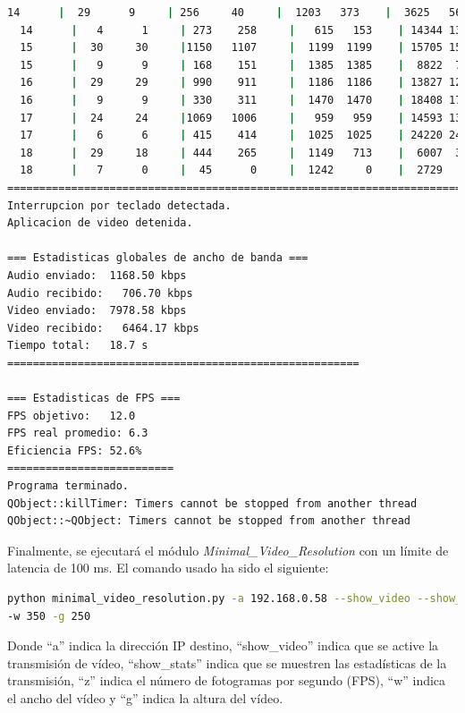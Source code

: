 \begin{lstlisting}[language=bash,basicstyle=\ttfamily\scriptsize]
  14      |  29      9     | 256     40     |  1203   373    |  3625   567    |  35     65
  14      |   4      1     | 273    258     |   615   153    | 14344 13555    |  18     64
  15      |  30     30     |1150   1107     |  1199  1199    | 15705 15117    |  25     69
  15      |   9      9     | 168    151     |  1385  1385    |  8822  7937    |  23     71
  16      |  29     29     | 990    911     |  1186  1186    | 13827 12725    |  36     72
  16      |   9      9     | 330    311     |  1470  1470    | 18408 17347    |  24     71
  17      |  24     24     |1069   1006     |   959   959    | 14593 13732    |  28     69
  17      |   6      6     | 415    414     |  1025  1025    | 24220 24162    |  31     72
  18      |  29     18     | 444    265     |  1149   713    |  6007  3584    |  31     72
  18      |   7      0     |  45      0     |  1242     0    |  2729     0    |  32     71
============================================================================================
Interrupcion por teclado detectada.
Aplicacion de video detenida.

=== Estadisticas globales de ancho de banda ===
Audio enviado:	1168.50 kbps
Audio recibido:   706.70 kbps
Video enviado:	7978.58 kbps
Video recibido:   6464.17 kbps
Tiempo total: 	18.7 s
=======================================================

=== Estadisticas de FPS ===
FPS objetivo: 	12.0
FPS real promedio: 6.3
Eficiencia FPS:	52.6%
==========================
Programa terminado.
QObject::killTimer: Timers cannot be stopped from another thread
QObject::~QObject: Timers cannot be stopped from another thread
\end{lstlisting}
\vspace{\baselineskip}

\newpage

Finalmente, se ejecutará el módulo \textit{Minimal\_Video\_Resolution} con un límite de latencia de 100 ms. El comando usado ha sido el siguiente:

\begin{lstlisting}[language=bash,basicstyle=\ttfamily\scriptsize]
python minimal_video_resolution.py -a 192.168.0.58 --show_video --show_stats -z 12 \\
-w 350 -g 250
\end{lstlisting}
Donde ``a'' indica la dirección IP destino, ``show\_video'' indica que se active la transmisión de vídeo, ``show\_stats'' indica que se muestren las estadísticas de la transmisión, ``z'' indica el número de fotogramas por segundo (FPS), ``w'' indica el ancho del vídeo y ``g'' indica la altura del vídeo.
\vspace{\baselineskip}

